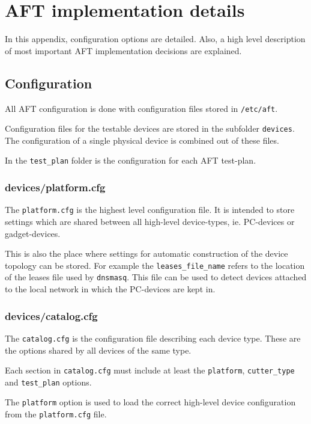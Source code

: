 \documentclass[a4paper,11pt]{article}
\newcommand{\cmd}[1]{\texttt{#1}}
\begin{document}
\newpage
\appendix
\section{AFT implementation details}
\label{app:aft}

In this appendix, configuration options are detailed. Also, a high level description of most important AFT implementation decisions are explained. 

\subsection{Configuration}

All AFT configuration is done with configuration files stored in \cmd{/etc/aft}.

Configuration files for the testable devices are stored in the subfolder \cmd{devices}. The configuration of a single physical device is combined out of these files.

In the \cmd{test\_plan} folder is the configuration for each AFT test-plan.

\subsubsection*{devices/platform.cfg}
The \cmd{platform.cfg} is the highest level configuration file. It is intended to store settings which are shared between all high-level device-types, ie. PC-devices or gadget-devices.

This is also the place where settings for automatic construction of the device topology can be stored. For example the \cmd{leases\_file\_name} refers to the location of the leases file used by \cmd{dnsmasq}. This file can be used to detect devices attached to the local network in which the PC-devices are kept in.

\subsubsection*{devices/catalog.cfg}
The \cmd{catalog.cfg} is the configuration file describing each device type. These are the options shared by all devices of the same type.

Each section in \cmd{catalog.cfg} must include at least the \cmd{platform}, \cmd{cutter\_type} and \cmd{test\_plan} options.

The \cmd{platform} option is used to load the correct high-level device configuration from the \cmd{platform.cfg} file. 
\end{document}
